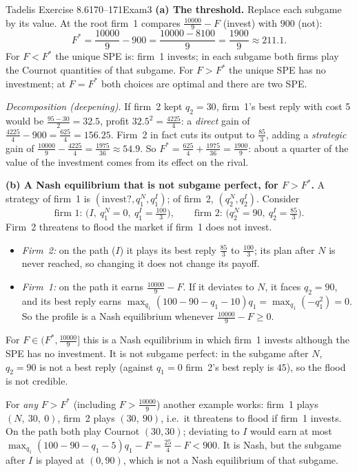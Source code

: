 \begin{exsol}{Tadelis Exercise 8.6}{170--171}{Exam}{3}
\textbf{(a) The threshold.} Replace each subgame by its value. At the root firm~1 compares
$\frac{10000}{9} - F$ (invest) with $900$ (not):
\[
  F^* = \frac{10000}{9} - 900 = \frac{10000 - 8100}{9} = \frac{1900}{9} \approx 211.1 .
\]
For $F < F^*$ the unique SPE is: firm~1 invests; in each subgame both firms play the Cournot
quantities of that subgame. For $F > F^*$ the unique SPE has no investment; at $F = F^*$ both choices
are optimal and there are two SPE.

\emph{Decomposition (deepening).} If firm~2 kept $q_2 = 30$, firm~1's best reply with cost 5 would be
$\frac{95 - 30}{2} = 32.5$, profit $32.5^2 = \frac{4225}{4}$: a \emph{direct} gain of $\frac{4225}{4} -
900 = \frac{625}{4} = 156.25$. Firm~2 in fact cuts its output to $\frac{85}{3}$, adding a
\emph{strategic} gain of $\frac{10000}{9} - \frac{4225}{4} = \frac{1975}{36} \approx 54.9$. So
$F^* = \frac{625}{4} + \frac{1975}{36} = \frac{1900}{9}$: about a quarter of the value of the
investment comes from its effect on the rival.

\textbf{(b) A Nash equilibrium that is not subgame perfect, for $F > F^*$.} A strategy of firm~1 is
$(\text{invest?}, q_1^N, q_1^I)$; of firm~2, $(q_2^N, q_2^I)$. Consider
\[
  \text{firm 1: } \bigl(I,\ q_1^N = 0,\ q_1^I = \tfrac{100}{3}\bigr), \qquad
  \text{firm 2: } \bigl(q_2^N = 90,\ q_2^I = \tfrac{85}{3}\bigr).
\]
Firm~2 threatens to flood the market if firm~1 does not invest.
\begin{itemize}
  \item \emph{Firm~2:} on the path ($I$) it plays its best reply $\frac{85}{3}$ to $\frac{100}{3}$; its
  plan after $N$ is never reached, so changing it does not change its payoff.
  \item \emph{Firm~1:} on the path it earns $\frac{10000}{9} - F$. If it deviates to $N$, it faces
  $q_2 = 90$, and its best reply earns $\max_{q_1} (100 - 90 - q_1 - 10)q_1 = \max_{q_1} (-q_1^2) = 0$.
  So the profile is a Nash equilibrium whenever $\frac{10000}{9} - F \ge 0$.
\end{itemize}
For $F \in (F^*, \frac{10000}{9}]$ this is a Nash equilibrium in which firm~1 invests although the SPE
has no investment. It is not subgame perfect: in the subgame after $N$, $q_2 = 90$ is not a best reply
(against $q_1 = 0$ firm~2's best reply is $45$), so the flood is not credible.

For \emph{any} $F > F^*$ (including $F > \frac{10000}{9}$) another example works: firm~1 plays
$(N,\ 30,\ 0)$, firm~2 plays $(30,\ 90)$, i.e.\ it threatens to flood if firm~1 invests. On the path
both play Cournot $(30,30)$; deviating to $I$ would earn at most
$\max_{q_1}(100 - 90 - q_1 - 5)q_1 - F = \frac{25}{4} - F < 900$. It is Nash, but the
subgame after $I$ is played at $(0, 90)$, which is not a Nash equilibrium of that subgame.


\end{exsol}
